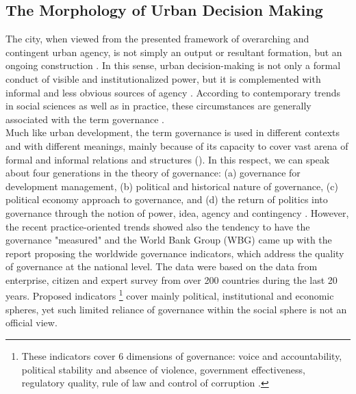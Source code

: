 \documentclass[11pt]{report}
\begin{document}
\subsection{The Morphology of Urban Decision Making}

The city, when viewed from the presented framework of overarching and contingent urban agency, is not simply an output or resultant formation,  but  an ongoing  construction \cite{McFarlane 2011}.
In this sense, urban decision-making is not only a formal conduct of visible and institutionalized power, but it is  complemented with informal and less obvious sources of agency \cite{(Lukes 1974 from Healey 1997)}.
According to contemporary trends in social sciences as well as in practice, these circumstances are generally associated with the term governance \cite{Pierre and Peters 2000}.
\\

Much like urban development, the term governance is used in different contexts and with different meanings, mainly because of its capacity to cover vast arena of formal and informal relations and structures (\href{Pierre}{\cite{Pierre_Governance_2000}}).
In this respect, we can speak about four generations in the theory of governance:
(a) governance for development management,
(b) political and historical nature of governance,
(c) political economy approach to governance,
and
(d) the return of politics into governance through the notion of power, idea, agency and contingency \cite{Hudson and Leftwich 2014}.
However, the recent practice-oriented trends showed also the tendency to have the governance "measured" and the World Bank Group (WBG) came up with the report proposing the worldwide governance indicators, which address the quality of governance at the national level.
The data were based on the data from enterprise, citizen and expert survey from over 200 countries during the last 20 years.
Proposed indicators
\footnote{These indicators cover 6 dimensions of governance: voice and accountability, political stability and absence of violence, government effectiveness, regulatory quality, rule of law and control of corruption \cite{WGI 2016}.}
cover mainly political, institutional and economic spheres, yet such limited reliance of governance within the social sphere is not an official view.
\\
\end{document}
